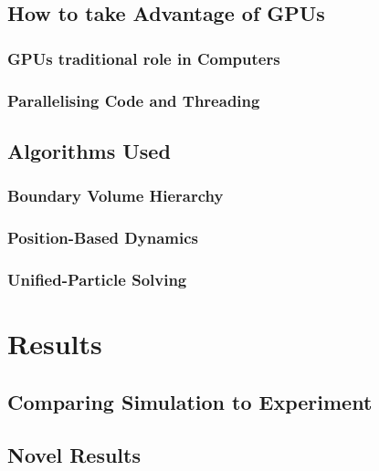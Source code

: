 \documentclass{book}
\begin{document}
\section{How to take Advantage of GPUs}
\subsection{GPUs traditional role in Computers}
\subsection{Parallelising Code and Threading}

\section{Algorithms Used}
\subsection{Boundary Volume Hierarchy}
\subsection{Position-Based Dynamics}
\subsection{Unified-Particle Solving}

\chapter{Results}
\section{Comparing Simulation to Experiment}
\section{Novel Results}

\chapter{}

\end{document}
